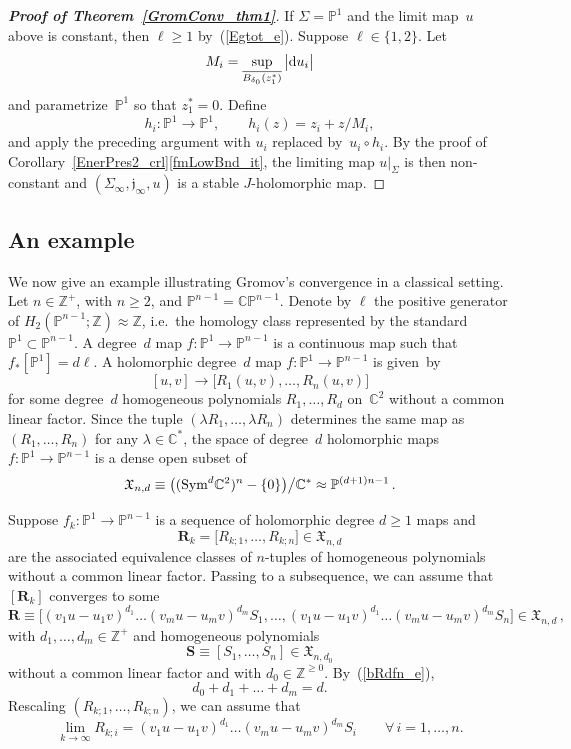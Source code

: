 \documentclass[11pt]{article}
\numberwithin{equation}{section}
\theoremstyle{definition}
\def\BE#1{\begin{equation}\label{#1}}
\def\EE{\end{equation}}
\def\eref#1{(\ref{#1})}
\def\ov#1{\overline{#1}}
\def\lra{\longrightarrow}
\def\C{\mathbb{C}}
\def\fj{\mathfrak j}
\def\P{\mathbb{P}}
\def\bR{\mathbf R}
\def\bS{\mathbf S}
\def\fX{\mathfrak X}
\def\Z{{\mathbb Z}}
\def\de{\delta}
\def\la{\lambda}
\def\Si{\Sigma}
\def\i{\infty}
\def\nd{\textnormal{d}}
\def\Sym{\textnormal{Sym}}
\begin{document}
\begin{proof}[{\bf\emph{Proof of Theorem~\ref{GromConv_thm1}}}]
\noindent
If $\Si\!=\!\P^1$ and the limit map~$u$ above is constant,
then $\ell\!\ge\!1$ by~\eref{Egtot_e}.
Suppose $\ell\!\in\!\{1,2\}$. 
Let
$$M_i=\sup_{\ov{B_{\de_0}(z_1^*)}}\big|\nd u_i\big|$$
and parametrize~$\P^1$ so that $z_1^*\!=\!0$.
Define 
$$h_i\!: \P^1\lra\P^1, \qquad  h_i(z)=z_i\!+\!z/M_i,$$
and apply the preceding argument with $u_i$ replaced by~$u_i\!\circ\!h_i$.
By the proof of Corollary~\ref{EnerPres2_crl}\ref{fmLowBnd_it}, the limiting map $u|_{\Si}$
is then non-constant and $(\Si_{\i},\fj_{\i},u)$ is a stable $J$-holomorphic map.
\end{proof}



\subsection{An example}
\label{PnEg_subs}

\noindent
We now give an example illustrating Gromov's convergence 
in a classical setting.\\

\noindent
Let $n\!\in\!\Z^+$, with $n\!\ge\!2$, and $\P^{n-1}\!=\!\C\P^{n-1}$.
Denote by $\ell$ the positive generator of $H_2(\P^{n-1};\Z)\!\approx\!\Z$,
i.e.~the homology class represented by the standard $\P^1\!\subset\!\P^{n-1}$.
A \textsf{degree~$d$ map} $f\!:\P^1\!\lra\!\P^{n-1}$ is a continuous map
such that $f_*[\P^1]\!=\!d\ell$.
A holomorphic degree~$d$ map $f\!:\P^1\!\lra\!\P^{n-1}$ is given~by
$$[u,v]\lra\big[R_1(u,v),\ldots,R_n(u,v)\big]$$ 
for some degree~$d$ homogeneous polynomials $R_1,\ldots,R_d$ on~$\C^2$
without a common linear factor.
Since the tuple $(\la R_1,\ldots,\la R_n)$ determines the same map
as $(R_1,\ldots,R_n)$ for any $\la\!\in\!\C^*$, 
the space of degree~$d$ holomorphic maps $f\!:\P^1\!\lra\!\P^{n-1}$ is
a dense open subset of
$$\fX_{n,d}\equiv \big((\Sym^d\C^2)^n-\{0\}\big)\big/\C^* 
\approx\P^{(d+1)n-1}\,.$$

\vspace{.1in}

\noindent
Suppose $f_k\!: \P^1\!\lra\!\P^{n-1}$ is a sequence of holomorphic degree $d\!\ge\!1$ maps
and
$$\bR_k=\big[R_{k;1},\ldots,R_{k;n}\big] \in\fX_{n,d}$$
are the associated equivalence classes of $n$-tuples of 
homogeneous polynomials  without a common linear factor.
Passing to a subsequence, we can assume that $[\bR_k]$ converges to some 
\BE{bRdfn_e}\bR\equiv\big[(v_1u\!-\!u_1v)^{d_1}\ldots(v_mu\!-\!u_mv)^{d_m}S_1,
\ldots,(v_1u\!-\!u_1v)^{d_1}\ldots(v_mu\!-\!u_mv)^{d_m}S_n\big]\in\fX_{n,d}\,,\EE
with $d_1,\ldots,d_m\!\in\!\Z^+$ and homogeneous polynomials
$$\bS\equiv [S_1,\ldots,S_n]\in \fX_{n,d_0}$$
without a common linear factor and with $d_0\!\in\!\Z^{\ge0}$.
By~\eref{bRdfn_e},
$$d_0+d_1+\ldots+d_m=d.$$
Rescaling $(R_{k;1},\ldots,R_{k;n})$, we can assume that 
\BE{Pneg_e3}
\lim_{k\lra\i}R_{k;i}=(v_1u\!-\!u_1v)^{d_1}\ldots(v_mu\!-\!u_mv)^{d_m}S_i
\qquad\forall\,i\!=\!1,\ldots,n.\EE
\end{document}
